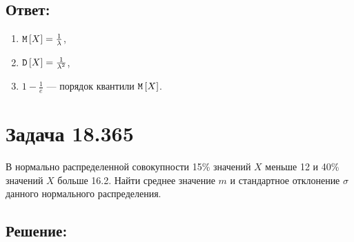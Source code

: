 \subsection*{Ответ:}
\begin{enumerate}
    \item $\mathtt{M} \left [ X \right ] = \frac{1}{\lambda}$,
    \item $\mathtt{D} \left [ X \right ] = \frac{1}{\lambda^2}$,
    \item $1 - \frac{1}{e}$ --- порядок квантили $\mathtt{M} \left [ X \right ]$.
\end{enumerate}

\section*{Задача 18.365}

В нормально распределенной совокупности 15\% значений $X$ меньше 12 и 40\% значений $X$ больше 16.2. Найти среднее значение $m$ и стандартное отклонение $\sigma$ данного
нормального распределения.

\subsection*{Решение:}

